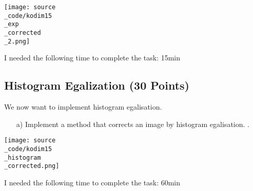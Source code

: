 \texttt{[image: source\\\_code/kodim15\\\_exp\\\_corrected\\\_2.png]}

I needed the following time to complete the task: 15min

\subsection{Histogram Egalization (30 Points)}

We now want to implement histogram egalisation. 

\begin{enumerate}
\item[a)] Implement a method that corrects an image by histogram egalisation. .
\end{enumerate}

\texttt{[image: source\\\_code/kodim15\\\_histogram\\\_corrected.png]}

I needed the following time to complete the task: 60min

